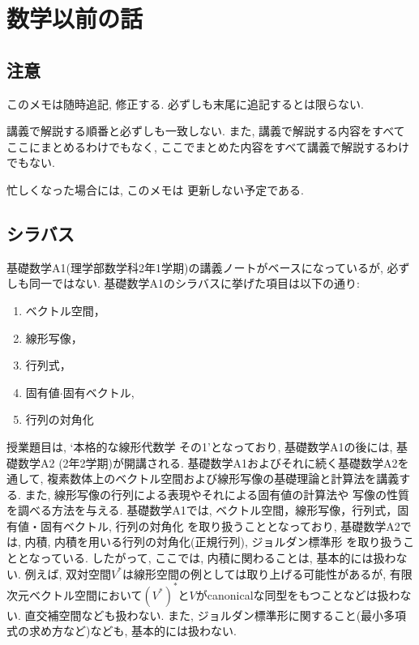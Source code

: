 \frontmatter
\let\originalthesection\thesection
\renewcommand{\thesection}{\alph{section}}

\chapter{数学以前の話}
\section{注意}
このメモは随時追記, 修正する.
必ずしも末尾に追記するとは限らない.

講義で解説する順番と必ずしも一致しない.
また, 講義で解説する内容をすべてここにまとめるわけでもなく,
ここでまとめた内容をすべて講義で解説するわけでもない.

忙しくなった場合には,
このメモは
更新しない予定である.

\section{シラバス}
基礎数学A1(理学部数学科2年1学期)の講義ノートがベースになっているが,
必ずしも同一ではない.
基礎数学A1のシラバスに挙げた項目は以下の通り:
\begin{enumerate}
\item
  ベクトル空間，
\item 線形写像，
\item 行列式，
\item 固有値$\cdot$固有ベクトル,
\item 行列の対角化
\end{enumerate}

授業題目は, `本格的な線形代数学 その1'となっており,
基礎数学A1の後には, 基礎数学A2 (2年2学期)が開講される.
基礎数学A1およびそれに続く基礎数学A2を通して,
複素数体上のベクトル空間および線形写像の基礎理論と計算法を講義する.
また, 線形写像の行列による表現やそれによる固有値の計算法や
写像の性質を調べる方法を与える.
基礎数学A1では,
ベクトル空間，線形写像，行列式，固有値・固有ベクトル, 行列の対角化
を取り扱うこととなっており,
基礎数学A2では,
内積, 内積を用いる行列の対角化(正規行列),
ジョルダン標準形
を取り扱うこととなっている.
したがって,
ここでは, 
内積に関わることは,
基本的には扱わない.
例えば, 双対空間$V^\ast$は線形空間の例としては取り上げる可能性があるが,
有限次元ベクトル空間において$(V^\ast)^\ast$と$V$がcanonicalな同型をもつことなどは扱わない.
直交補空間なども扱わない.
また, ジョルダン標準形に関すること(最小多項式の求め方など)なども,
基本的には扱わない.


